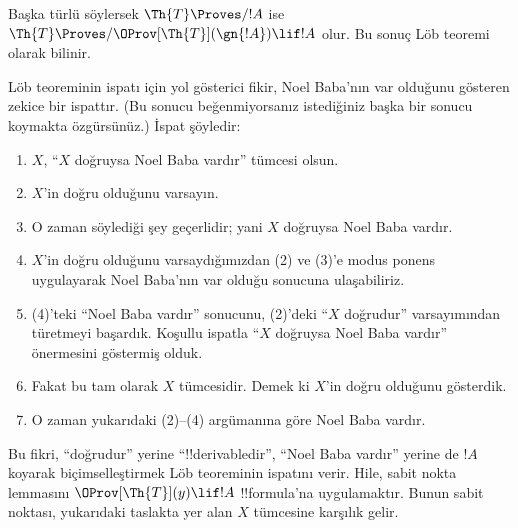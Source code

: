 \documentclass[../../../include/open-logic-section]{subfiles}
\begin{document}
Başka türlü söylersek $\Th{T} \Proves/ !A$ ise
$\Th{T} \Proves/ \OProv[\Th{T}](\gn{!A}) \lif !A$ olur. Bu sonuç L\"ob
teoremi olarak bilinir.

\begin{explain}
L\"ob teoreminin ispatı için yol gösterici fikir, Noel Baba'nın var olduğunu
gösteren zekice bir ispattır. (Bu sonucu beğenmiyorsanız istediğiniz başka bir
sonucu koymakta özgürsünüz.) İspat şöyledir:
\begin{enumerate}
\item $X$, ``$X$ doğruysa Noel Baba vardır'' tümcesi olsun.
\item $X$'in doğru olduğunu varsayın.
\item O zaman söylediği şey geçerlidir; yani $X$ doğruysa Noel Baba vardır.
\item $X$'in doğru olduğunu varsaydığımızdan (2) ve (3)'e modus ponens
  uygulayarak Noel Baba'nın var olduğu sonucuna ulaşabiliriz.
\item (4)'teki ``Noel Baba vardır'' sonucunu, (2)'deki ``$X$ doğrudur''
  varsayımından türetmeyi başardık. Koşullu ispatla ``$X$ doğruysa Noel Baba
  vardır'' önermesini göstermiş olduk.
\item Fakat bu tam olarak $X$ tümcesidir. Demek ki $X$'in doğru olduğunu
  gösterdik.
\item O zaman yukarıdaki (2)--(4) argümanına göre Noel Baba vardır.
\end{enumerate}
Bu fikri, ``doğrudur'' yerine ``!!{derivable}{}dir'', ``Noel Baba vardır''
yerine de $!A$ koyarak biçimselleştirmek L\"ob teoreminin ispatını verir.
Hile, sabit nokta lemmasını $\OProv[\Th{T}](y) \lif !A$ !!{formula}'na
uygulamaktır. Bunun sabit noktası, yukarıdaki taslakta yer alan $X$ tümcesine
karşılık gelir.
\end{explain}
\end{document}
